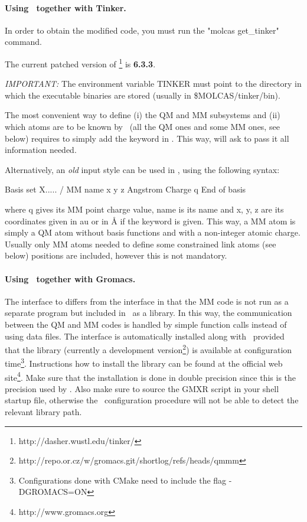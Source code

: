\paragraph{Using \molcas\ together with Tinker.}
In order to obtain the modified  code, you must run the "molcas get\_tinker" command.

The current patched version of \footnote{http://dasher.wustl.edu/tinker/} is {\bf 6.3.3}.

\emph{IMPORTANT:} The environment variable TINKER must point to the directory in which the  executable binaries are stored (usually in \$MOLCAS/tinker/bin).

The most convenient way to define (i) the QM and MM subsystems and (ii) which atoms are to be known by \molcas\ (all the QM ones and some MM ones, see below) requires to simply add the keyword  in . This way,  will ask  to pass it all information needed.

Alternatively, an \emph{old} input style can be used in , using the following syntax:
\begin{inputlisting}
Basis set
X..... / MM
  name  x  y  z  Angstrom
Charge
  q
End of basis
\end{inputlisting}
where q gives its MM point charge value, name is its name and x, y, z are its coordinates given in au or in {\AA} if the  keyword is given. This way, a MM atom is simply a QM atom without basis functions and with a non-integer atomic charge. Usually only MM atoms needed to define some constrained link atoms (see below) positions are included, however this is not mandatory.

\paragraph{Using \molcas\ together with Gromacs.}
The interface to  differs from the  interface in that the MM code is not run as a separate program but included in \molcas\ as a library. In this way, the communication between the QM and MM codes is handled by simple function calls instead of using data files. The interface is automatically installed along with \molcas\ provided that the  library (currently a development version\footnote{http://repo.or.cz/w/gromacs.git/shortlog/refs/heads/qmmm}) is available at configuration time\footnote{Configurations done with CMake need to include the flag -DGROMACS=ON}. Instructions how to install the  library can be found at the official web site\footnote{http://www.gromacs.org}. Make sure that the installation is done in double precision since this is the precision used by \molcas. Also make sure to source the  GMXR script in your shell startup file, otherwise the \molcas\ configuration procedure will not be able to detect the relevant library path.

